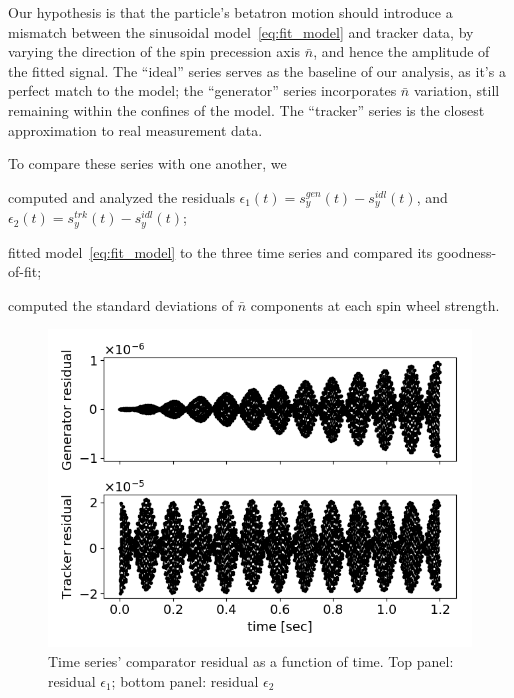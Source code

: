 \documentclass[a4paper]{jacow}
\newcommand{\nbar}{\bar n}
\begin{document}
Our hypothesis is that the particle's betatron
motion should introduce a mismatch between the sinusoidal
model~\eqref{eq:fit_model} and tracker data, by varying the direction
of the spin precession axis $\nbar$, and hence the amplitude of the
fitted signal. The ``ideal'' series serves as the baseline of our
analysis, as it's a perfect match to the model; the ``generator''
series incorporates $\nbar$ variation, still remaining within the confines of
the model. The ``tracker'' series is the closest approximation to
real measurement data.

To compare these series with one another, we
\begin{inparaenum}
\item computed and analyzed the residuals
  $\epsilon_1(t) = s_y^{gen}(t) - s_y^{idl}(t)$, and
  $\epsilon_2(t) = s_y^{trk}(t) - s_y^{idl}(t)$;
\item fitted model~\eqref{eq:fit_model} to the three time series and
  compared its goodness-of-fit;
\item computed the standard deviations of $\nbar$ components at each
  spin wheel strength.
\end{inparaenum}

\begin{figure}[h]
  \centering
    \includegraphics[width=\linewidth]{../img/IPAC19/residual_vs_time(both)}
  \caption{Time series' comparator residual as a function of time.
    Top panel: residual $\epsilon_1$; bottom panel: residual $\epsilon_2$\label{fig:residuals}}
\end{figure}
\end{document}
